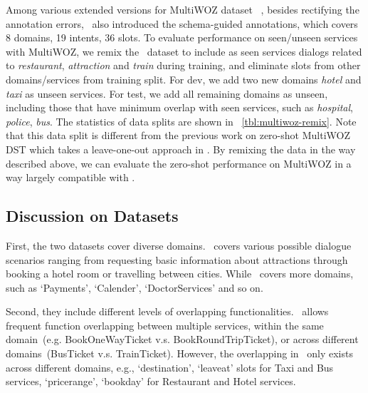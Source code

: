 Among various extended versions for MultiWOZ
dataset~\cite[2.0-2.3,][]{budzianowski2018multiwoz,
  eric2020multiwoz,zang-etal-2020-multiwoz,han2020multiwoz} , besides
rectifying the annotation errors, \multiwoz ~also introduced the
schema-guided annotations, which covers 8 domains, 19 intents, 36
slots.  To evaluate performance on seen/unseen services with MultiWOZ,
we remix the \multiwoz~dataset to include as seen services dialogs
related to \textit{restaurant}, \textit{attraction} and \textit{train}
during training, and eliminate slots from other domains/services from
training split.  For dev, we add two new domains {\it hotel} and {\it
  taxi} as unseen services. For test, we add all remaining domains as
unseen, including those that have minimum overlap with seen services,
such as {\it hospital}, {\it police}, {\it bus}. The statistics of
data splits are shown in
~\autoref{tbl:multiwoz-remix}. Note that this data split
is different from the previous work on zero-shot MultiWOZ DST which
takes a leave-one-out approach in \citet{wu2019transferable}. By
remixing the data in the way described above, we can evaluate the
zero-shot performance on MultiWOZ in a way largely compatible with
\sgdst.

\subsection{Discussion on Datasets}
\label{ssec:sgd:discussion-datasets}

First, the two datasets cover diverse domains. \multiwoz~covers
various possible dialogue scenarios ranging from requesting basic
information about attractions through booking a hotel room or
travelling between cities. While \sgdst~covers more domains, such as
`Payments', `Calender', `DoctorServices' and so on.

Second, they include different levels of overlapping
functionalities. \sgdst~allows frequent function overlapping between
multiple services, within the same domain~(e.g. BookOneWayTicket
v.s. BookRoundTripTicket), or across different domains~(BusTicket
v.s. TrainTicket). However, the overlapping in \multiwoz~only exists
across different domains, e.g., `destination', `leaveat' slots for
Taxi and Bus services, `pricerange', `bookday' for Restaurant and
Hotel services.

